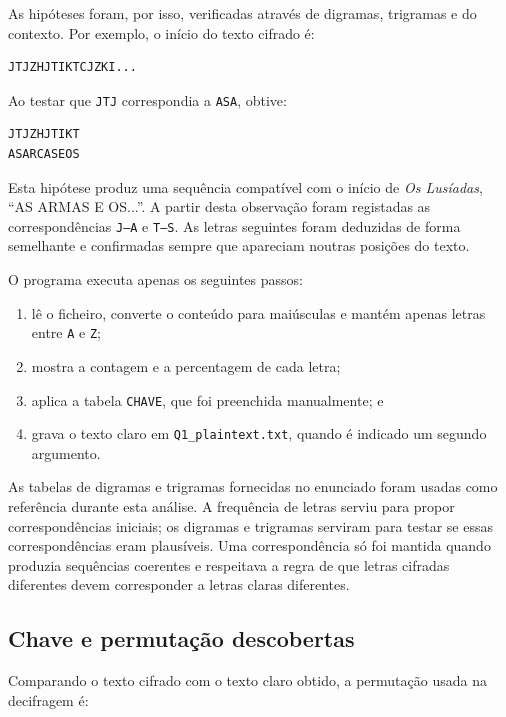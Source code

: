 \documentclass[11pt,a4paper]{article}
\begin{document}
As hipóteses foram, por isso, verificadas através de digramas, trigramas e do
contexto. Por exemplo, o início do texto cifrado é:

\begin{verbatim}
JTJZHJTIKTCJZKI...
\end{verbatim}

Ao testar que \texttt{JTJ} correspondia a \texttt{ASA}, obtive:

\begin{verbatim}
JTJZHJTIKT
ASARCASEOS
\end{verbatim}

Esta hipótese produz uma sequência compatível com o início de
\textit{Os Lusíadas}, ``AS ARMAS E OS...''. A partir desta observação foram
registadas as correspondências \texttt{J--A} e \texttt{T--S}. As letras
seguintes foram deduzidas de forma semelhante e confirmadas sempre que
apareciam noutras posições do texto.

O programa executa apenas os seguintes passos:
\begin{enumerate}
\item lê o ficheiro, converte o conteúdo para maiúsculas e mantém apenas letras
      entre \texttt{A} e \texttt{Z};
\item mostra a contagem e a percentagem de cada letra;
\item aplica a tabela \texttt{CHAVE}, que foi preenchida manualmente; e
\item grava o texto claro em \texttt{Q1\_plaintext.txt}, quando é indicado um
      segundo argumento.
\end{enumerate}

As tabelas de digramas e trigramas fornecidas no enunciado foram usadas como
referência durante esta análise. A frequência de letras serviu para propor
correspondências iniciais; os digramas e trigramas serviram para testar se essas
correspondências eram plausíveis. Uma correspondência só foi mantida quando
produzia sequências coerentes e respeitava a regra de que letras cifradas
diferentes devem corresponder a letras claras diferentes.

\subsection*{Chave e permutação descobertas}

Comparando o texto cifrado com o texto claro obtido, a permutação usada na
decifragem é:
\end{document}
